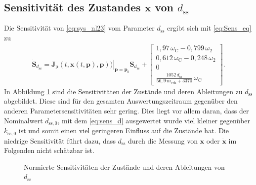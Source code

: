 \subsection{Sensitivität des Zustandes $\pmb{x}$ von $d_\mathrm{ss}$}
Die Sensitivität von \eqref{eq:sys_nl23} vom Parameter $d_\mathrm{ss}$ ergibt sich mit \eqref{eq:Sens_eq} zu
\begin{align}\label{eq:sens_d}
\pmb{\dot{S}}_{d_\mathrm{ss}} = \left. \pmb{J}_\mathrm{p}(t,\pmb{x}(t,\pmb{p}),\pmb{p}))\right|_{\pmb{p}=\pmb{p}_0} \pmb{S}_{d_\mathrm{ss}} 
+ \begin{bmatrix} 1,97\,\omega_\mathrm{C} - 0,799\,\omega_\mathrm{2}\\
                  0,612\,\omega_\mathrm{C} - 0,248\,\omega_\mathrm{2}\\
                                                       0\\
 \frac{1052\,d_\mathrm{ss}}{56,9\,m_\mathrm{veh} + 3370}\,\omega_\mathrm{C}\end{bmatrix}.
\end{align}
In Abbildung \ref{fig:Sens_d} sind die Sensitivitäten der Zustände und deren Ableitungen zu $d_\mathrm{ss}$ abgebildet. Diese sind für den gesamten Auswertungszeitraum gegenüber den anderen Parametersensitivitäten sehr gering. Dies liegt vor allem daran, dass der Nominalwert $d_\mathrm{ss,0}$, mit dem \eqref{eq:sens_d} ausgewertet wurde viel kleiner gegenüber $k_\mathrm{ss,0}$ ist und somit einen viel geringeren Einfluss auf die Zustände hat. Die niedrige Sensitivität führt dazu, dass $d_\mathrm{ss}$ durch die Messung von $\pmb{x}$ oder $\pmb{\dot{x}}$ im Folgenden nicht schätzbar ist.

\begin{figure}
\centering
\newlength\dheight 
\setlength\dheight{8cm}
\newlength\dwidth 
\setlength\dwidth{13cm}

\caption{Normierte Sensitivitäten der Zustände und deren Ableitungen von $d_\mathrm{ss}$}
\label{fig:Sens_d}
\end{figure}

